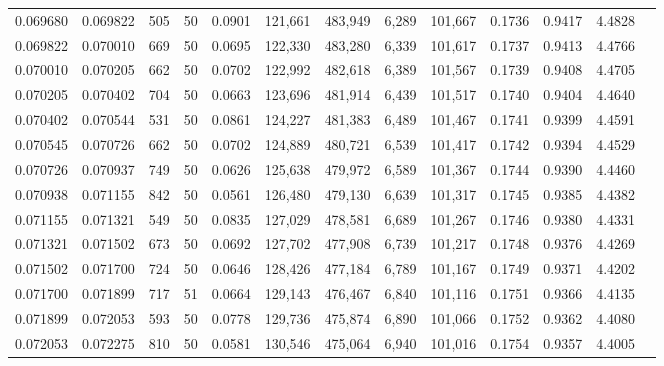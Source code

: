 \begin{tabular}{rrrrrrrrrrrrr}
0.069680 & 0.069822 &   505 &  50 &                                     0.0901 & 121,661 & 483,949 &   6,289 & 101,667 & 0.1736 & 0.9417 & 4.4828 \\
0.069822 & 0.070010 &   669 &  50 &                                     0.0695 & 122,330 & 483,280 &   6,339 & 101,617 & 0.1737 & 0.9413 & 4.4766 \\
0.070010 & 0.070205 &   662 &  50 &                                     0.0702 & 122,992 & 482,618 &   6,389 & 101,567 & 0.1739 & 0.9408 & 4.4705 \\
0.070205 & 0.070402 &   704 &  50 &                                     0.0663 & 123,696 & 481,914 &   6,439 & 101,517 & 0.1740 & 0.9404 & 4.4640 \\
0.070402 & 0.070544 &   531 &  50 &                                     0.0861 & 124,227 & 481,383 &   6,489 & 101,467 & 0.1741 & 0.9399 & 4.4591 \\
0.070545 & 0.070726 &   662 &  50 &                                     0.0702 & 124,889 & 480,721 &   6,539 & 101,417 & 0.1742 & 0.9394 & 4.4529 \\
0.070726 & 0.070937 &   749 &  50 &                                     0.0626 & 125,638 & 479,972 &   6,589 & 101,367 & 0.1744 & 0.9390 & 4.4460 \\
0.070938 & 0.071155 &   842 &  50 &                                     0.0561 & 126,480 & 479,130 &   6,639 & 101,317 & 0.1745 & 0.9385 & 4.4382 \\
0.071155 & 0.071321 &   549 &  50 &                                     0.0835 & 127,029 & 478,581 &   6,689 & 101,267 & 0.1746 & 0.9380 & 4.4331 \\
0.071321 & 0.071502 &   673 &  50 &                                     0.0692 & 127,702 & 477,908 &   6,739 & 101,217 & 0.1748 & 0.9376 & 4.4269 \\
0.071502 & 0.071700 &   724 &  50 &                                     0.0646 & 128,426 & 477,184 &   6,789 & 101,167 & 0.1749 & 0.9371 & 4.4202 \\
0.071700 & 0.071899 &   717 &  51 &                                     0.0664 & 129,143 & 476,467 &   6,840 & 101,116 & 0.1751 & 0.9366 & 4.4135 \\
0.071899 & 0.072053 &   593 &  50 &                                     0.0778 & 129,736 & 475,874 &   6,890 & 101,066 & 0.1752 & 0.9362 & 4.4080 \\
0.072053 & 0.072275 &   810 &  50 &                                     0.0581 & 130,546 & 475,064 &   6,940 & 101,016 & 0.1754 & 0.9357 & 4.4005 \\

\end{tabular}
